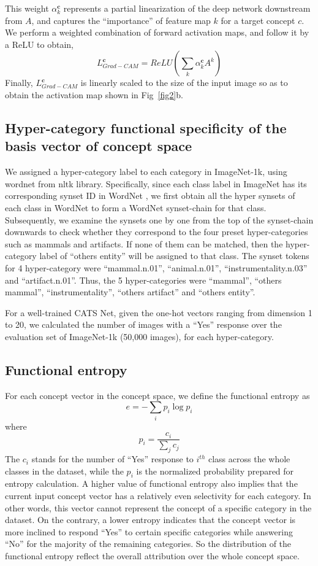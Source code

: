 \documentclass[pdflatex,sn-mathphys-num,lineno]{sn-jnl}%
\begin{document}
\begin{CJK}{UTF8}{gbsn}
This weight $\alpha_k^\mathbf{c}$ represents a partial linearization of the deep network downstream from $A$, and captures the “importance” of feature map $k$ for a target concept $c$. We perform a weighted combination of forward activation maps, and follow it by a ReLU to obtain,
\[
L_{Grad-CAM}^{\mathbf{c}} = ReLU(\sum_k \alpha_k^\mathbf{c} A^k)
\] 
Finally, $L_{Grad-CAM}^{\mathbf{c}}$ is linearly scaled to the size of the input image so as to obtain the activation map shown in Fig~\ref{fig2}b.

\subsection{Hyper-category functional specificity of the basis vector of concept space}
We assigned a hyper-category label to each category in ImageNet-1k, using wordnet from nltk library. Specifically, since each class label in ImageNet has its corresponding synset ID in WordNet \cite{fellbaum_wordnet_1998}, we first obtain all the hyper synsets of each class in WordNet to form a WordNet synset-chain for that class. Subsequently, we examine the synsets one by one from the top of the synset-chain downwards to check whether they correspond to the four preset hyper-categories such as mammals and artifacts. If none of them can be matched, then the hyper-category label of “others entity” will be assigned to that class. The synset tokens for 4 hyper-category were “mammal.n.01”, “animal.n.01”, “instrumentality.n.03” and “artifact.n.01”. Thus, the 5 hyper-categories were “mammal”, “others mammal”, “instrumentality”, “others artifact” and “others entity”.

For a well-trained CATS Net, given the one-hot vectors ranging from dimension 1 to 20, we calculated the number of images with a “Yes” response over the evaluation set of ImageNet-1k (50,000 images), for each hyper-category.

\subsection{Functional entropy}
For each concept vector in the concept space, we define the functional entropy as 
\[
\displaystyle e=-\sum_{i} p_i \log p_i
\]
where 
\[
\displaystyle p_i = \frac{c_i}{\sum_{j}c_j}
\]
The $c_i$ stands for the number of “Yes” response to $i^{th}$ class across the whole classes in the dataset, while the $p_i$ is the normalized probability prepared for entropy calculation. A higher value of functional entropy also implies that the current input concept vector has a relatively even selectivity for each category. In other words, this vector cannot represent the concept of a specific category in the dataset. On the contrary, a lower entropy indicates that the concept vector is more inclined to respond “Yes” to certain specific categories while answering “No” for the majority of the remaining categories. So the distribution of the functional entropy reflect the overall attribution over the whole concept space.


\end{CJK}
\end{document}
